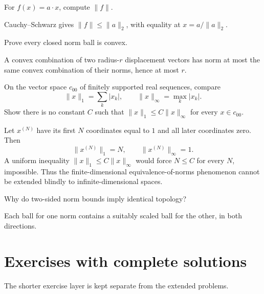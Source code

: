 \begin{problem}\label{prob:ii02-problem-09}
For $f(x)=a\cdot x$, compute $\|f\|$.
\end{problem}
\begin{solution}
Cauchy--Schwarz gives $\|f\|\le\|a\|_2$, with equality at $x=a/\|a\|_2$.
\end{solution}

\begin{problem}\label{prob:ii02-problem-10}
Prove every closed norm ball is convex.
\end{problem}
\begin{solution}
A convex combination of two radius-$r$ displacement vectors has norm at most the same convex combination of their norms, hence at most $r$.
\end{solution}

\begin{problem}\label{prob:ii02-problem-11}
On the vector space $c_{00}$ of finitely supported real sequences, compare
\[
\|x\|_1=\sum_k|x_k|,
\qquad
\|x\|_\infty=\max_k|x_k|.
\]
Show there is no constant $C$ such that $\|x\|_1\le C\|x\|_\infty$ for every $x\in c_{00}$.
\end{problem}
\begin{solution}
Let $x^{(N)}$ have its first $N$ coordinates equal to $1$ and all later coordinates zero. Then
\[
\|x^{(N)}\|_1=N,
\qquad
\|x^{(N)}\|_\infty=1.
\]
A uniform inequality $\|x\|_1\le C\|x\|_\infty$ would force $N\le C$ for every $N$, impossible. Thus the finite-dimensional equivalence-of-norms phenomenon cannot be extended blindly to infinite-dimensional spaces.
\end{solution}

\begin{problem}\label{prob:ii02-problem-12}
Why do two-sided norm bounds imply identical topology?
\end{problem}
\begin{solution}
Each ball for one norm contains a suitably scaled ball for the other, in both directions.
\end{solution}

\section{Exercises with complete solutions}
The shorter exercise layer is kept separate from the extended problems.

